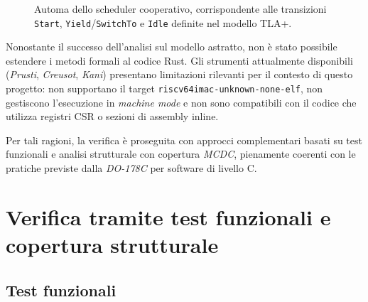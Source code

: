 \documentclass[italian, Lau, oneside]{sapthesis} %
\begin{document}
\begin{figure}[H]
\centering
{}

\caption{Automa dello scheduler cooperativo, corrispondente alle transizioni \texttt{Start}, \texttt{Yield}/\texttt{SwitchTo} e \texttt{Idle} definite nel modello TLA+.}
\label{fig:scheduler_automaton}
\end{figure}



Nonostante il successo dell’analisi sul modello astratto, non è stato possibile estendere i metodi formali al codice Rust. Gli strumenti attualmente disponibili (\textit{Prusti}, \textit{Creusot}, \textit{Kani}) presentano limitazioni rilevanti per il contesto di questo progetto: non supportano il target \texttt{riscv64imac-unknown-none-elf}, non gestiscono l’esecuzione in \textit{machine mode} e non sono compatibili con il codice che utilizza registri CSR o sezioni di assembly inline.

Per tali ragioni, la verifica è proseguita con approcci complementari basati su test funzionali e analisi strutturale con copertura \textit{MCDC}, pienamente coerenti con le pratiche previste dalla \textit{DO-178C} per software di livello C.


\section{Verifica tramite test funzionali e copertura strutturale}

\subsection{Test funzionali}
\end{document}
